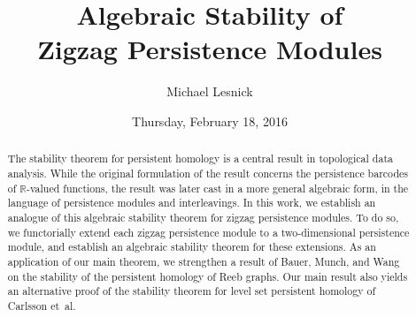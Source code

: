 \documentclass{UAmathtalk}
\author{Michael Lesnick}
\title{Algebraic Stability of\\ Zigzag Persistence Modules}
\date{Thursday, February 18, 2016}
\begin{document}
\maketitle

\begin{abstract}
The stability theorem for persistent homology is a central result in topological data analysis.  While the original formulation of the result concerns the persistence barcodes of $\mathbb{R}$-valued functions, the result was later cast in a more general algebraic form, in the language of persistence modules and interleavings.  In this work, we establish an analogue of this algebraic stability theorem for zigzag persistence modules.  To do so, we functorially extend each zigzag persistence module to a two-dimensional persistence module, and establish an algebraic stability theorem for these extensions.  As an application of our main theorem, we strengthen a result of Bauer, Munch, and Wang on the stability of the persistent homology of Reeb graphs.  Our main result also yields an alternative proof of the stability theorem for level set persistent homology of Carlsson et~al.
\end{abstract}
\end{document}
